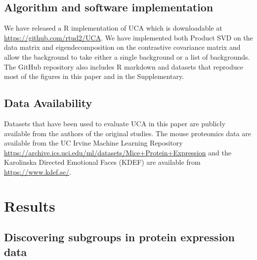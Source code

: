 \documentclass[10pt]{article}
\begin{document}
\subsection{Algorithm and software implementation}
We have released a R implementation of UCA which is downloadable at \url{https://github.com/rtud2/UCA}. We have implemented both Product SVD on the data matrix and eigendecomposition on the contrastive covariance matrix and allow the background to take either a single background or a list of backgrounds. The GitHub repository also includes R markdown and datasets that reproduce most of the figures in this paper and in the Supplementary.

\subsection{Data Availability}
Datasets that have been used to evaluate UCA in this paper are publicly available from the authors of the original studies. The mouse proteomics data are available from the UC Irvine Machine Learning Repository \url{https://archive.ics.uci.edu/ml/datasets/Mice+Protein+Expression} and the Karolinska Directed Emotional Faces (KDEF) are available from \url{https://www.kdef.se/}.


\section{Results\label{sec:results}}
\subsection{\label{sec:mouse}Discovering subgroups in protein expression data}
\end{document}
